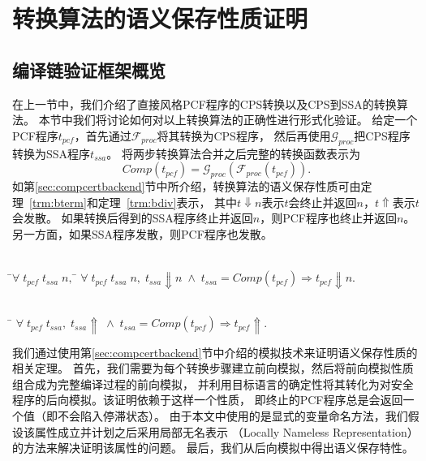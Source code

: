 
\chapter{转换算法的语义保存性质证明} \label{ch:verify}

\section{编译链验证框架概览} \label{sec:verifyoverview}

在上一节中，我们介绍了直接风格PCF程序的CPS转换以及CPS到SSA的转换算法。
本节中我们将讨论如何对以上转换算法的正确性进行形式化验证。
给定一个PCF程序$t_{pcf}$，首先通过$\mathcal{F}_{proc}$将其转换为CPS程序，
然后再使用$\mathcal{G}_{proc}$把CPS程序转换为SSA程序$t_{ssa}$。
将两步转换算法合并之后完整的转换函数表示为
\begin{equation}
Comp(t_{pcf}) = \mathcal{G}_{proc}(\mathcal{F}_{proc}(t_{pcf})).
\end{equation}
如第\ref{sec:compcertbackend}节中所介绍，转换算法的语义保存性质可由定理~\ref{trm:bterm}和定理~\ref{trm:bdiv}表示，
其中$t \Downarrow n$表示$t$会终止并返回$n$，$t \Uparrow$表示$t$会发散。
如果转换后得到的SSA程序终止并返回$n$，则PCF程序也终止并返回$n$。另一方面，如果SSA程序发散，则PCF程序也发散。

\begin{theorem}[程序终止行为的保存]\label{trm:bterm} 
    \begin{tabbing}
     \\
    \quad\=$\forall \; t_{pcf}\; t_{ssa}\; n,\; $\=\kill
    \>$\forall \; t_{pcf}\; t_{ssa}\; n,\; t_{ssa}\Downarrow n\; \wedge \; t_{ssa}=Comp(t_{pcf}) \Longrightarrow t_{pcf}\Downarrow n.$
    \end{tabbing}
  \end{theorem}
  
  \begin{theorem}[程序发散行为的保存]\label{trm:bdiv}
    \begin{tabbing}
      \\
    \quad\=\kill
    \>$\forall \; t_{pcf}\; t_{ssa},\; t_{ssa}\Uparrow\; \wedge \; t_{ssa}=Comp(t_{pcf})\Longrightarrow t_{pcf}\Uparrow.$
    \end{tabbing}
  \end{theorem}

我们通过使用第\ref{sec:compcertbackend}节中介绍的模拟技术来证明语义保存性质的相关定理。
首先，我们需要为每个转换步骤建立前向模拟，然后将前向模拟性质组合成为完整编译过程的前向模拟，
并利用目标语言的确定性将其转化为对安全程序的后向模拟。该证明依赖于这样一个性质，
即终止的PCF程序总是会返回一个值（即不会陷入停滞状态）。
由于本文中使用的是显式的变量命名方法，我们假设该属性成立并计划之后采用局部无名表示
（Locally Nameless Representation）的方法来解决证明该属性的问题。
最后，我们从后向模拟中得出语义保存特性。

